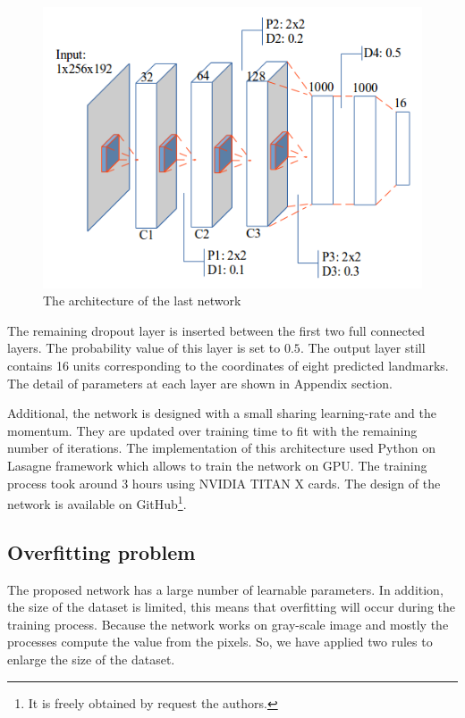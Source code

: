 \documentclass[conference]{IEEEtran}
\begin{document}
\begin{figure}[htbp]
	\centerline{\includegraphics[scale=0.45]{images/architecture3}}
	\caption{The architecture of the last network}
	\label{figarch}
\end{figure}

The remaining dropout layer is inserted between the first two full connected layers. The probability value of this layer is set to $0.5$. The output layer still contains 16 units corresponding to the coordinates of eight predicted landmarks. The detail of parameters at each layer are shown in Appendix section. 

Additional, the network is designed with a small sharing learning-rate and the momentum. They are updated over training time to fit with the remaining number of iterations. The implementation of this architecture used Python on Lasagne framework\cite{lasagne} which allows to train the network on GPU. The training process took around 3 hours using NVIDIA TITAN X cards. The design of the network is available on GitHub\footnote{It is freely obtained by request the authors.}.
\subsection{Overfitting problem}
The proposed network has a large number of learnable parameters. In addition, the size of the dataset is limited, this means that overfitting will occur during the training process. Because the network works on  gray-scale image and mostly the processes compute the value from the pixels. So, we have applied two rules to enlarge the size of the dataset.
\end{document}
